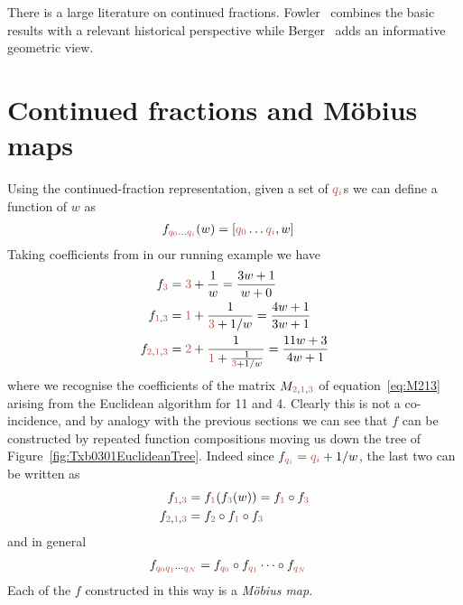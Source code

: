 There is a large literature on continued fractions. Fowler~\cite{fowlerMathematicsPlatoAcademy1999} combines the basic results with a relevant historical perspective while Berger~\cite{bergerGeometryRevealedJacob2010} adds an informative geometric view. 

\section{Continued fractions and M\"obius maps}
\newcommand{\wC}{w}%
Using the continued-fraction representation, given a set of $\jqix{i}$s we can define a function of $\wC$ as
\begin{align}
	f_{\jqix{0}\ldots \jqix{i}}(\wC) &= [\jqix{0}\ldots \jqix{i}  , \wC] 
\end{align}
Taking coefficients from in our running example we  have 
\begin{align}
	\begin{split}
f_{\jqn{3}}&=  \jqn{3} + \frac{1}{\wC} = \frac{3 \wC+1}{\wC+0} 
\\
f_{\jqn{1},\jqn{3}}  &=  \jqn{1} + \frac{1}{\jqn{3}+1/\wC} = \frac{4 \wC+1}{3\wC+1} 
\\ 
f_{\jqn{2},\jqn{1},\jqn{3}}  &=  \jqn{2} + \frac{1}{\jqn{1}+\frac{1}{
		\jqn{3}+1/\wC}} = \frac{11 \wC+3}{4\wC+1} %
	\end{split}\label{eq:fq}
\end{align}
where we recognise the coefficients of the matrix $M_{\jqn{2},\jqn{1},\jqn{3}}$ of equation~\ref{eq:M213} arising from the Euclidean algorithm for 11 and 4. Clearly this is not a co-incidence, and by analogy with the previous sections we can see that $f$ can be constructed by repeated function compositions moving us down the tree of Figure~\ref{fig:Txb0301EuclideanTree}. 
Indeed since $	f_{\jqix{i}}  =  \jqix{i} +1/{\wC}  $, the last two can be written as
\begin{align}	
	f_{\jqn{1},\jqn{3}}  &=  	f_{\jqn{1}}(	f_{\jqn{3}}(\wC)) = 	f_{\jqn{1}}\circ 	f_{\jqn{3}}
	\\	f_{\jqn{2},\jqn{1},\jqn{3}}  &=
	 f_{\jqn{2}}\circ 	f_{\jqn{1}} \circ 	f_{\jqn{3}}
\end{align}
and in general
\begin{align}
	f_{\jqix{0}\jqix{1}\cdots\jqix{N}} &= 	f_{\jqix{0}}\circ f_{\jqix{1}}\cdots\circ f_{\jqix{N}}
\end{align}
Each of the $f$ constructed in this way is a \textit{M\"obius map}.

